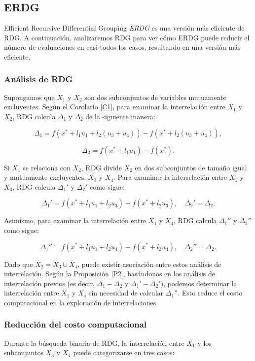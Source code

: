 \subsection{ERDG}
Efficient Recursive Differential Grouping \textit{ERDG} \cite{ERDG} es una versión más eficiente de RDG. A continuación, analizaremos RDG para ver cómo ERDG puede reducir el número de evaluaciones en casi todos los casos, resultando en una versión más eficiente.

\subsubsection{Análisis de RDG}
Supongamos que \(X_1\) y \(X_2\) son dos subconjuntos de variables mutuamente excluyentes. Según el Corolario \ref{C1}, para examinar la interrelación entre \(X_1\) y \(X_2\), RDG calcula \(\Delta_1\) y \(\Delta_2\) de la siguiente manera:

\[
\Delta_1 = f(x^* + l_1 u_1 + l_2 (u_3 + u_4)) - f(x^* + l_2 (u_3 + u_4)),
\]

\[
\Delta_2 = f(x^* + l_1 u_1) - f(x^*).
\]

Si \(X_1\) se relaciona con \(X_2\), RDG divide \(X_2\) en dos subconjuntos de tamaño igual y mutuamente excluyentes, \(X_3\) y \(X_4\). Para examinar la interrelación entre \(X_1\) y \(X_3\), RDG calcula \(\Delta_1'\) y \(\Delta_2'\) como sigue:

\[
\Delta_1' = f(x^* + l_1 u_1 + l_2 u_3) - f(x^* + l_2 u_3), \quad \Delta_2' = \Delta_2.
\]

Asimismo, para examinar la interrelación entre \(X_1\) y \(X_4\), RDG calcula \(\Delta_1''\) y \(\Delta_2''\) como sigue:

\[
\Delta_1'' = f(x^* + l_1 u_1 + l_2 u_4) - f(x^* + l_2 u_4), \quad \Delta_2'' = \Delta_2.
\]

Dado que \(X_2 = X_3 \cup X_4\), puede existir asociación entre estos análisis de interrelación. Según la Proposición \ref{P2}, basándonos en los análisis de interrelación previos (es decir, \(\Delta_1 - \Delta_2\) y \(\Delta_1' - \Delta_2'\)), podemos determinar la interrelación entre \(X_1\) y \(X_4\) sin necesidad de calcular \(\Delta_1''\). Esto reduce el costo computacional en la exploración de interrelaciones.

\subsubsection{Reducción del costo computacional}
Durante la búsqueda binaria de RDG, la interrelación entre \(X_1\) y los subconjuntos \(X_3\) y \(X_4\) puede categorizarse en tres casos:

